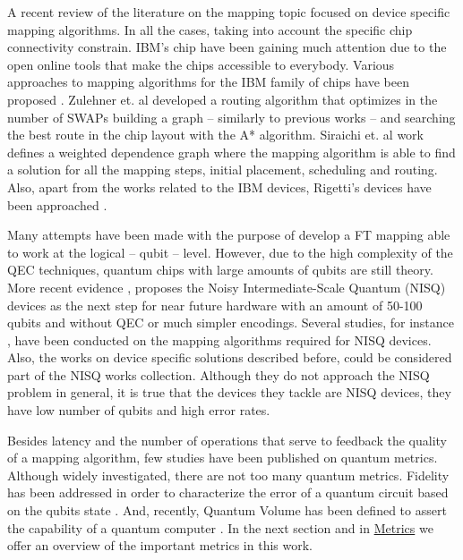 A recent review of the literature on the mapping topic focused on device specific mapping algorithms.
In all the cases, taking into account the specific chip connectivity constrain.
IBM's chip have been gaining much attention due to the open online tools that make the chips accessible to everybody.
Various approaches to mapping algorithms for the IBM family of chips have been proposed \cite{zulehner17:effic_method_mappin_quant_circuit,Siraichi_2018,mckay18:qiskit_backen_specif_openq_openp_exper,Dueck_2018}.
Zulehner et. al \cite{zulehner17:effic_method_mappin_quant_circuit} developed a routing algorithm that optimizes in the number of SWAPs building a graph -- similarly to previous works --  and searching the best route in the chip layout with the A* algorithm.
Siraichi et. al \cite{Siraichi_2018} work defines a weighted dependence graph where the mapping algorithm is able to find a solution for all the mapping steps, initial placement, scheduling and routing.
Also, apart from the works related to the IBM devices, Rigetti's devices have been approached \cite{Venturelli_2018}.

Many attempts have been made \cite{Dousti_2014,Heckey_2015,hwang18:hierar_system_mappin_large_scale,murphy18:contr,Lao_2018} with the purpose of develop a FT mapping able to work at the logical -- qubit -- level.
However, due to the high complexity of the QEC techniques, quantum chips with large amounts of qubits are still theory.
More recent evidence \cite{Preskill_2018}, proposes the Noisy Intermediate-Scale Quantum (NISQ) devices as the next step for near future hardware with an amount of 50-100 qubits and without QEC or much simpler encodings.
Several studies, for instance \cite{tannu18:case_variab_aware_polic_nisq,paler18:nisq,paler18:influen_initial_qubit_placem_durin}, have been conducted on the mapping algorithms required for NISQ devices.
Also, the works on device specific solutions \cite{zulehner17:effic_method_mappin_quant_circuit,Siraichi_2018,mckay18:qiskit_backen_specif_openq_openp_exper,Dueck_2018,Venturelli_2018} described before, could be considered part of the NISQ works collection.
Although they do not approach the NISQ problem in general, it is true that the devices they tackle are NISQ devices, they have low number of qubits and high error rates.

Besides latency and the number of operations that serve to feedback the quality of a mapping algorithm, few studies have been published on quantum metrics.
Although widely investigated, there are not too many quantum metrics.
Fidelity has been addressed in order to characterize the error of a quantum circuit based on the qubits state \cite{Jozsa_1994,Nielsen_2009}.
And, recently, Quantum Volume has been defined to assert the capability of a quantum computer \cite{Moll_2018}.
In the next section and in \href{chapter-3.org}{Metrics} we offer an overview of the important metrics in this work.

